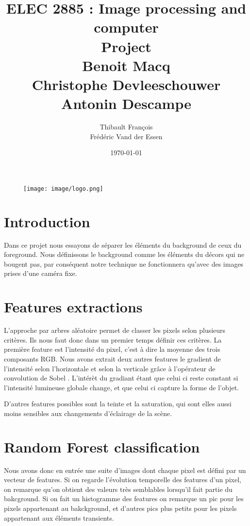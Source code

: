 \documentclass[8pt,a4paper]{article}
\title{ELEC 2885 : Image processing and computer  \\ Project \\
Benoit Macq \\ Christophe Devleeschouwer \\ Antonin Descampe}
\author{Thibault François \\ Frédéric Vand der Essen}
\date{\today}
\begin{document}
	\begin{titlepage}		
		\begin{figure}[tbp]
			\begin{center}
				\texttt{[image: image/logo.png]}
			\end{center}
		\end{figure}
		\maketitle
	\end{titlepage}

\begin{multicols}{2}
\section{Introduction}
Dans ce projet nous essayons de séparer les éléments du background de ceux du foreground. Nous définissons le background comme les éléments du décors
qui ne bougent pas, par conséquent notre technique ne fonctionnera qu'avec des images prises d'une caméra fixe. 

\section{Features extractions}
	L'approche par arbres aléatoire permet de classer les pixels selon plusieurs critères. Ils nous faut donc dans un premier temps définir ces critères. 
	La première feature est l'intensité du pixel, c'est à dire la moyenne des trois composants RGB. 
	Nous avons extrait deux autres features le gradient de l'intensité selon l'horizontale et selon la verticale \cite{gradient} 
	grâce à l'opérateur de convolution de Sobel \cite{sobel}. L'intérèt du gradiant étant que celui ci reste constant si l'intensité lumineuse globale change,
	et que celui ci capture la forme de l'objet. 

	D'autres features possibles sont la teinte et la saturation, qui sont elles aussi moins sensibles aux changements d'éclairage de la scène. \cite{hsv} 

\section{Random Forest classification}

	Nous avons donc en entrée une suite d'images dont chaque pixel est défini par un vecteur de features.
	Si on regarde l'évolution temporelle des features d'un pixel, on remarque qu'on obtient des valeurs très
	semblables lorsqu'il fait partie du bakcground. Si on fait un histogramme des features on remarque un pic
	pour les pixels appartenant au bakckground, et d'autres pics plus petits pour les pixels appartenant aux
	éléments transients. 


\end{multicols}
\end{document}

